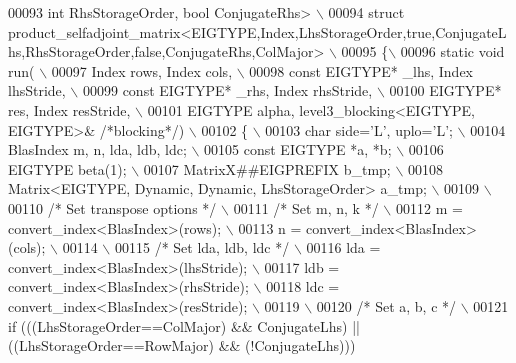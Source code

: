 \begin{DoxyCode}
00093 \textcolor{preprocessor}{          int RhsStorageOrder, bool ConjugateRhs> \(\backslash\)}
00094 \textcolor{preprocessor}{struct
       product\_selfadjoint\_matrix<EIGTYPE,Index,LhsStorageOrder,true,ConjugateLhs,RhsStorageOrder,false,ConjugateRhs,ColMajor> \(\backslash\)}
00095 \textcolor{preprocessor}{\{\(\backslash\)}
00096 \textcolor{preprocessor}{  static void run( \(\backslash\)}
00097 \textcolor{preprocessor}{    Index rows, Index cols, \(\backslash\)}
00098 \textcolor{preprocessor}{    const EIGTYPE* \_lhs, Index lhsStride, \(\backslash\)}
00099 \textcolor{preprocessor}{    const EIGTYPE* \_rhs, Index rhsStride, \(\backslash\)}
00100 \textcolor{preprocessor}{    EIGTYPE* res,        Index resStride, \(\backslash\)}
00101 \textcolor{preprocessor}{    EIGTYPE alpha, level3\_blocking<EIGTYPE, EIGTYPE>& }\textcolor{comment}{/*blocking*/}\textcolor{preprocessor}{) \(\backslash\)}
00102 \textcolor{preprocessor}{  \{ \(\backslash\)}
00103 \textcolor{preprocessor}{    char side='L', uplo='L'; \(\backslash\)}
00104 \textcolor{preprocessor}{    BlasIndex m, n, lda, ldb, ldc; \(\backslash\)}
00105 \textcolor{preprocessor}{    const EIGTYPE *a, *b; \(\backslash\)}
00106 \textcolor{preprocessor}{    EIGTYPE beta(1); \(\backslash\)}
00107 \textcolor{preprocessor}{    MatrixX##EIGPREFIX b\_tmp; \(\backslash\)}
00108 \textcolor{preprocessor}{    Matrix<EIGTYPE, Dynamic, Dynamic, LhsStorageOrder> a\_tmp; \(\backslash\)}
00109 \textcolor{preprocessor}{\(\backslash\)}
00110 \textcolor{preprocessor}{}\textcolor{comment}{/* Set transpose options */}\textcolor{preprocessor}{ \(\backslash\)}
00111 \textcolor{preprocessor}{}\textcolor{comment}{/* Set m, n, k */}\textcolor{preprocessor}{ \(\backslash\)}
00112 \textcolor{preprocessor}{    m = convert\_index<BlasIndex>(rows); \(\backslash\)}
00113 \textcolor{preprocessor}{    n = convert\_index<BlasIndex>(cols); \(\backslash\)}
00114 \textcolor{preprocessor}{\(\backslash\)}
00115 \textcolor{preprocessor}{}\textcolor{comment}{/* Set lda, ldb, ldc */}\textcolor{preprocessor}{ \(\backslash\)}
00116 \textcolor{preprocessor}{    lda = convert\_index<BlasIndex>(lhsStride); \(\backslash\)}
00117 \textcolor{preprocessor}{    ldb = convert\_index<BlasIndex>(rhsStride); \(\backslash\)}
00118 \textcolor{preprocessor}{    ldc = convert\_index<BlasIndex>(resStride); \(\backslash\)}
00119 \textcolor{preprocessor}{\(\backslash\)}
00120 \textcolor{preprocessor}{}\textcolor{comment}{/* Set a, b, c */}\textcolor{preprocessor}{ \(\backslash\)}
00121 \textcolor{preprocessor}{    if (((LhsStorageOrder==ColMajor) && ConjugateLhs) || ((LhsStorageOrder==RowMajor) && (!ConjugateLhs)))
}
\end{DoxyCode}
